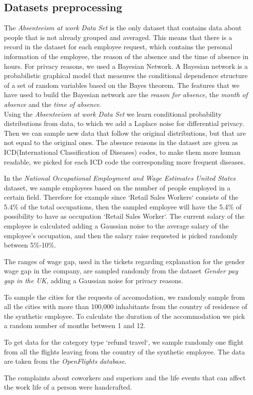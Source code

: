 \subsection{Datasets preprocessing}
The \textit{Absenteeism at work Data Set} is the only dataset that contains data about people that is not already grouped and averaged. This means that there is a record in the dataset for each employee request, which contains the personal information of the employee, the reason of the absence and the time of absence in hours. For privacy reasons, we used a Bayesian Network. A Bayesian network is a probabilistic graphical model that measures the conditional dependence structure of a set of random variables based on the Bayes theorem. The features that we have used to build the Bayesian network are the \textit{reason for absence}, the \textit{month of absence} and the \textit{time of absence}.
\\
Using the \textit{Absenteeism at work Data Set} we learn conditional probability distributions from data, to which we add a Laplace noise for differential privacy. Then we can sample new data that follow the original distributions, but that are not equal to the original ones. The absence reasons in the dataset are given as ICD(International Classification of Diseases) codes, to make them more human readable, we picked for each ICD code the corresponding more frequent diseases.

In the \textit{National Occupational Employment and Wage Estimates United States} dataset, we sample employees based on the number of people employed in a certain field. Therefore for example since `Retail Sales Workers` consists of the 5.4\% of the total occupations, then the sampled employee will have the 5.4\% of possibility to have as occupation `Retail Sales Worker`.
The current salary of the employee is calculated adding a Gaussian noise to the average salary of the employee's occupation, and then the salary raise requested is picked randomly between 5\%-10\%.

The ranges of wage gap, used in the tickets regarding explanation for the gender wage gap in the company, are sampled randomly from the dataset \textit{Gender pay gap in the UK}, adding a Gaussian noise for privacy reasons.

To sample the cities for the requests of accomodation, we randomly sample from all the cities with more than 100,000 inhabitants from the country of residence of the synthetic employee. To calculate the duration of the accommodation we pick a random number of months between 1 and 12.

To get data for the category type `refund travel`, we sample randomly one flight from all the flights leaving from the country of the synthetic employee. The data are taken from the \textit{OpenFlights database}.

The complaints about coworkers and superiors and the life events that can affect the work life of a person were handcrafted.


